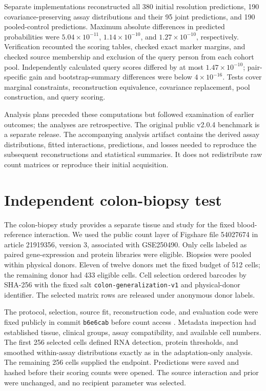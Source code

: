 Separate implementations reconstructed all 380 initial resolution predictions,
190 covariance-preserving assay distributions and their 95 joint predictions,
and 190 pooled-control predictions. Maximum absolute differences in predicted
probabilities were $5.04\times10^{-11}$, $1.14\times10^{-10}$, and
$1.27\times10^{-10}$, respectively. Verification recounted the scoring tables,
checked exact marker margins, and checked source membership and exclusion of
the query person from each cohort pool. Independently calculated query
scores differed by at most $1.47\times10^{-10}$; pair-specific gain and
bootstrap-summary differences were below $4\times10^{-16}$.
Tests cover marginal constraints, reconstruction equivalence,
covariance replacement, pool construction, and query scoring.

Analysis plans preceded these computations but followed examination of earlier
outcomes; the analyses are retrospective. The original public v2.0.4 benchmark
is a separate release. The accompanying analysis artifact contains the
derived assay distributions, fitted interactions, predictions, and losses
needed to reproduce the subsequent reconstructions and statistical summaries.
It does not redistribute raw count matrices or reproduce their initial acquisition.

\section{Independent colon-biopsy test}

The colon-biopsy study \cite{mennillo2024} provides a separate tissue and study
for the fixed blood-reference interaction. We used the public count layer of
Figshare file 54027674 in article 21919356, version 3, associated with GSE250490.
Only cells labeled as paired gene-expression and protein libraries were
eligible. Biopsies were pooled within physical donors. Eleven of twelve donors
met the fixed budget of 512 cells; the remaining donor had 433 eligible cells.
Cell selection ordered barcodes by SHA-256 with the fixed salt
\texttt{colon-generalization-v1} and physical-donor identifier. The selected
matrix rows are released under anonymous donor labels.

The protocol, selection, source fit, reconstruction code, and evaluation code
were fixed publicly in commit \texttt{b6e6cab} before count access
\cite{colontest2026}. Metadata inspection had established tissue, clinical
groups, assay compatibility, and available cell numbers. The first 256
selected cells defined RNA detection, protein thresholds, and smoothed
within-assay distributions exactly as in the adaptation-only analysis.
The remaining 256 cells supplied the endpoint. Predictions were saved and
hashed before their scoring counts were opened. The source interaction and
prior were unchanged, and no recipient parameter was selected.

